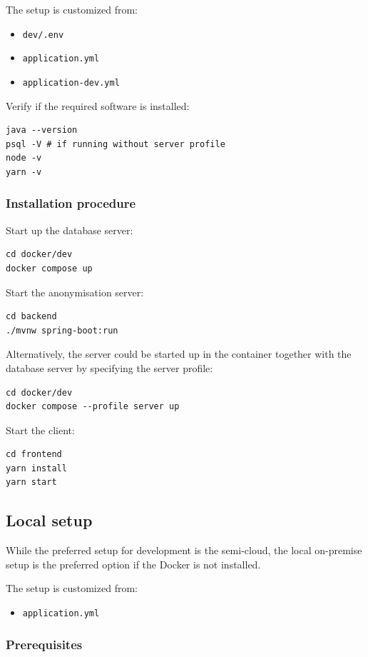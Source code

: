 \documentclass[a4paper,twoside,12pt]{book}
\begin{document}
The setup is customized from:
\begin{itemize}
\item \verb|dev/.env|
\item \verb|application.yml|
\item \verb|application-dev.yml|
\end{itemize}

Verify if the required software is installed:
\begin{verbatim}
java --version
psql -V # if running without server profile
node -v
yarn -v
\end{verbatim}


\subsubsection{Installation procedure}
Start up the database server:
\begin{verbatim}
cd docker/dev
docker compose up
\end{verbatim}

Start the anonymisation server:
\begin{verbatim}
cd backend
./mvnw spring-boot:run
\end{verbatim}

Alternatively, the server could be started up in the container together with the database server by specifying the server profile:
\begin{verbatim}
cd docker/dev
docker compose --profile server up
\end{verbatim}



Start the client:
\begin{verbatim}
cd frontend
yarn install
yarn start
\end{verbatim}

\subsection{Local setup}

While the preferred setup for development is the semi-cloud, the local on-premise setup is the preferred option if the Docker is not installed.

The setup is customized from:
\begin{itemize}
\item \verb|application.yml|
\end{itemize}

\subsubsection{Prerequisites}
\end{document}
